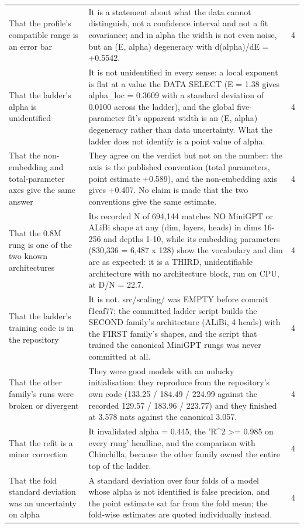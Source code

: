 \begin{longtable}{L{7.6cm}L{5.4cm}L{1.6cm}}
That the profile's compatible range is an error bar & It is a statement about what the data cannot distinguish, not a confidence interval and not a fit covariance; and in alpha the width is not even noise, but an (E, alpha) degeneracy with d(alpha)/dE = +0.5542. & 4 \\
That the ladder's alpha is unidentified & It is not unidentified in every sense: a local exponent is flat at a value the DATA SELECT (E = 1.38 gives alpha\_loc = 0.3609 with a standard deviation of 0.0100 across the ladder), and the global five-parameter fit's apparent width is an (E, alpha) degeneracy rather than data uncertainty. What the ladder does not identify is a point value of alpha. & 4 \\
That the non-embedding and total-parameter axes give the same answer & They agree on the verdict but not on the number: the axis is the published convention (total parameters, point estimate +0.589), and the non-embedding axis gives +0.407. No claim is made that the two conventions give the same estimate. & 4 \\
That the 0.8M rung is one of the two known architectures & Its recorded N of 694,144 matches NO MiniGPT or ALiBi shape at any (dim, layers, heads) in dims 16-256 and depths 1-10, while its embedding parameters (830,336 = 6,487 x 128) show the vocabulary and dim are as expected: it is a THIRD, unidentifiable architecture with no architecture block, run on CPU, at D/N = 22.7. & 4 \\
That the ladder's training code is in the repository & It is not. src/scaling/ was EMPTY before commit f1eaf77; the committed ladder script builds the SECOND family's architecture (ALiBi, 4 heads) with the FIRST family's shapes, and the script that trained the canonical MiniGPT rungs was never committed at all. & 4 \\
That the other family's runs were broken or divergent & They were good models with an unlucky initialisation: they reproduce from the repository's own code (133.25 / 184.49 / 224.99 against the recorded 129.57 / 183.96 / 223.77) and they finished at 3.578 nats against the canonical 3.057. & 4 \\
That the refit is a minor correction & It invalidated alpha = 0.445, the 'R\textasciicircum{}2 >= 0.985 on every rung' headline, and the comparison with Chinchilla, because the other family owned the entire top of the ladder. & 4 \\
That the fold standard deviation was an uncertainty on alpha & A standard deviation over four folds of a model whose alpha is not identified is false precision, and the point estimate sat far from the fold mean; the fold-wise estimates are quoted individually instead. & 4 \\

\end{longtable}
